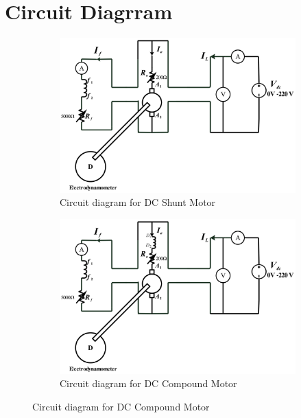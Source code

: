 \documentclass[a4paper,12pt]{article}
\begin{document}
	\section{Circuit Diagrram}

	
	
	\begin{figure}[H]
		\centering
		\begin{subfigure}[t]{.9\textwidth}
			\centering
		\includegraphics[width=1.1\textwidth]{Images/3.3}
			\caption{Circuit diagram for DC Shunt Motor}
			\vspace{0.5cm}
		\end{subfigure}
	
		\begin{subfigure}[t]{.9\textwidth}
			\centering
		\includegraphics[width=1.1\textwidth]{Images/3.2}
			\caption{ Circuit diagram for DC Compound Motor }
		\end{subfigure}
		
		
	\end{figure}
	
\end{document}
